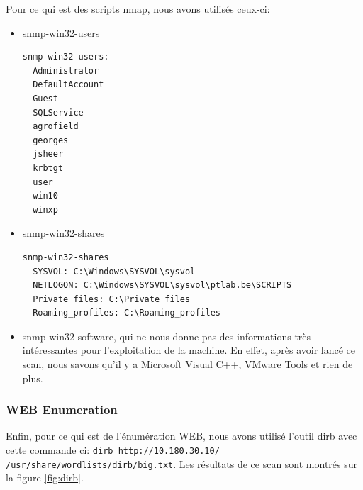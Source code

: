 \documentclass[french,paper=a4,oneside,captions=tableheading]{article}
\begin{document}
Pour ce qui est des scripts nmap, nous avons utilisés ceux-ci:
\begin{itemize}

\item snmp-win32-users
\begin{example}
\begin{Verbatim}
snmp-win32-users: 
  Administrator
  DefaultAccount
  Guest
  SQLService
  agrofield
  georges
  jsheer
  krbtgt
  user
  win10
  winxp
\end{Verbatim}
\end{example}

\item snmp-win32-shares
\begin{example}
\begin{Verbatim}
snmp-win32-shares
  SYSVOL: C:\Windows\SYSVOL\sysvol
  NETLOGON: C:\Windows\SYSVOL\sysvol\ptlab.be\SCRIPTS
  Private files: C:\Private files
  Roaming_profiles: C:\Roaming_profiles
\end{Verbatim}
\end{example}

\item snmp-win32-software, qui ne nous donne pas des informations très intéressantes pour l'exploitation de la machine. En effet, après avoir lancé ce scan, nous savons qu'il y a Microsoft Visual C++, VMware Tools et rien de plus.

\end{itemize}



\subsubsection{WEB Enumeration}

Enfin, pour ce qui est de l'énumération WEB, nous avons utilisé l'outil dirb avec cette commande ci: \texttt{dirb http://10.180.30.10/ /usr/share/wordlists/dirb/big.txt}. Les résultats de ce scan sont montrés sur la figure \ref{fig:dirb}.
\end{document}
